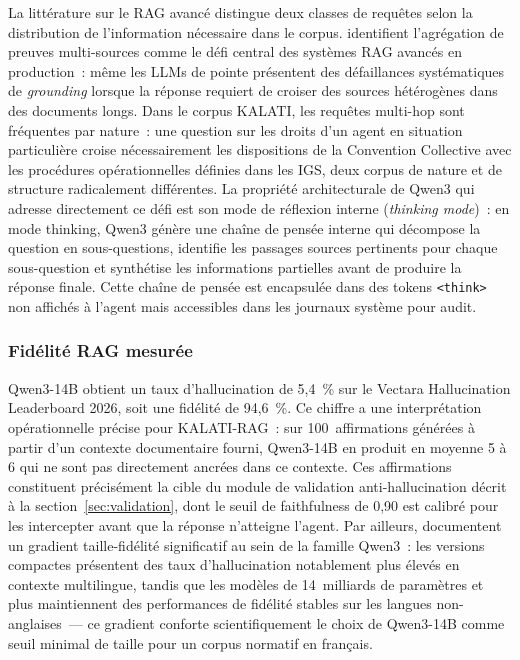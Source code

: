 \documentclass[12pt,a4paper]{report}
\begin{document}
La littérature sur le RAG avancé distingue deux classes de requêtes selon la distribution de
l'information nécessaire dans le corpus. \textcite{Gao2025} identifient l'agrégation de preuves
multi-sources comme le défi central des systèmes RAG avancés en production~: même les LLMs de
pointe présentent des défaillances systématiques de \textit{grounding} lorsque la réponse requiert
de croiser des sources hétérogènes dans des documents longs. Dans le corpus KALATI, les requêtes
multi-hop sont fréquentes par nature~: une question sur les droits d'un agent en situation
particulière croise nécessairement les dispositions de la Convention Collective avec les procédures
opérationnelles définies dans les IGS, deux corpus de nature et de structure radicalement
différentes. La propriété architecturale de Qwen3 qui adresse directement ce défi est son mode
de réflexion interne (\textit{thinking mode})~: en mode thinking, Qwen3 génère une chaîne de
pensée interne qui décompose la question en sous-questions, identifie les passages sources
pertinents pour chaque sous-question et synthétise les informations partielles avant de produire
la réponse finale. Cette chaîne de pensée est encapsulée dans des tokens \texttt{<think>} non
affichés à l'agent mais accessibles dans les journaux système pour audit.

\subsubsection*{Fidélité RAG mesurée}

Qwen3-14B obtient un taux d'hallucination de 5,4~\% sur le Vectara Hallucination Leaderboard
2026, soit une fidélité de 94,6~\%. Ce chiffre a une interprétation opérationnelle précise pour
KALATI-RAG~: sur 100~affirmations générées à partir d'un contexte documentaire fourni, Qwen3-14B
en produit en moyenne 5 à 6 qui ne sont pas directement ancrées dans ce contexte. Ces affirmations
constituent précisément la cible du module de validation anti-hallucination décrit à la
section~\ref{sec:validation}, dont le seuil de faithfulness de 0,90 est calibré pour les
intercepter avant que la réponse n'atteigne l'agent. Par ailleurs, \textcite{Thoresen2026}
documentent un gradient taille-fidélité significatif au sein de la famille Qwen3~: les versions
compactes présentent des taux d'hallucination notablement plus élevés en contexte multilingue,
tandis que les modèles de 14~milliards de paramètres et plus maintiennent des performances de
fidélité stables sur les langues non-anglaises~--- ce gradient conforte scientifiquement le
choix de Qwen3-14B comme seuil minimal de taille pour un corpus normatif en français.
\end{document}
